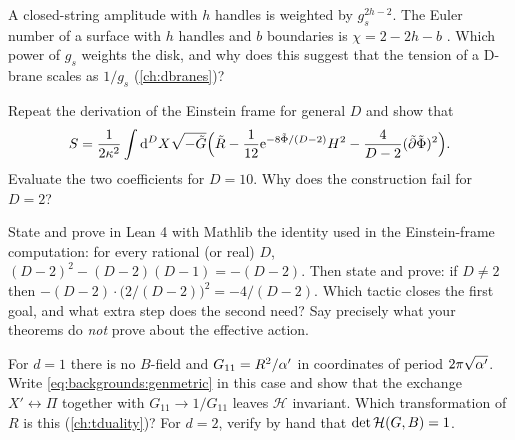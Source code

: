 \begin{exercise}[$\star$]\label{exr:backgrounds:genus}
A closed-string amplitude with $h$ handles is weighted by $g_s^{2h-2}$. The Euler
number of a surface with $h$ handles and $b$ boundaries is $\chi=2-2h-b$
. Which power of $g_s$ weights the disk, and why does this
suggest that the tension of a D-brane scales as $1/g_s$ (\cref{ch:dbranes})?
\end{exercise}

\begin{exercise}[$\star\star$]\label{exr:backgrounds:frame}
Repeat the derivation of the Einstein frame for general $D$ and show that
\[
  S=\frac{1}{2\kappa^2}\int\mathrm{d}^DX\sqrt{-\tilde G}\Bigl(\tilde R
  -\frac1{12}\mathrm{e}^{-8\tilde\Phi/(D-2)}H^2-\frac{4}{D-2}(\tilde\partial\tilde\Phi)^2\Bigr).
\]
Evaluate the two coefficients for $D=10$. Why does the construction fail for $D=2$?
\end{exercise}

\begin{exercise}\label{exr:backgrounds:leanframe}
State and prove in Lean 4 with Mathlib the identity used in the Einstein-frame computation:
for every rational (or real) $D$, $(D-2)^2-(D-2)(D-1)=-(D-2)$. Then state and prove: if
$D\neq2$ then $-(D-2)\cdot\bigl(2/(D-2)\bigr)^2=-4/(D-2)$. Which tactic closes the first
goal, and what extra step does the second need? Say precisely what your theorems do
\emph{not} prove about the effective action.
\end{exercise}

\begin{exercise}[$\star\star$]\label{exr:backgrounds:hamiltonian}
For $d=1$ there is no $B$-field and $G_{11}=R^2/\alpha'$ in coordinates of period
$2\pi\sqrt{\alpha'}$. Write \eqref{eq:backgrounds:genmetric} in this case and show that the
exchange $X'\leftrightarrow\Pi$ together with $G_{11}\to1/G_{11}$ leaves $\mathcal H$
invariant. Which transformation of $R$ is this (\cref{ch:tduality})? For $d=2$, verify by hand
that $\det\mathcal{H}(G,B)=1$.
\end{exercise}

